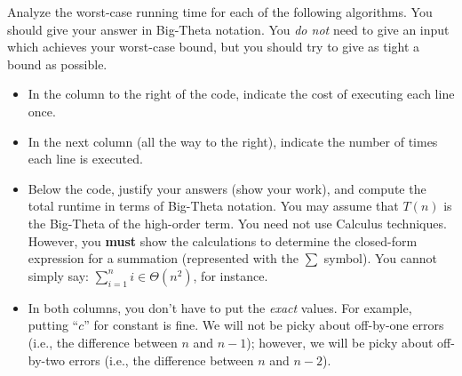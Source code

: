 \documentclass[9pt]{article}
\begin{document}
\item 
Analyze the worst-case running time for each of the following algorithms. You should give your answer in Big-Theta notation. You \emph{do not} need to give an input which achieves your worst-case bound, but you should try to give as tight a bound as possible. 
	\begin{itemize}
	\item In the column to the right of the code, indicate the cost of executing each line once.
	
	\item In the next column (all the way to the right), indicate the number of times each line is executed.
	
	\item Below the code, justify your answers (show your work), and compute the total runtime in terms of Big-Theta notation.  You may assume that $T(n)$ is the Big-Theta of the high-order term. You need not use Calculus techniques. However, you \textbf{must} show the calculations to determine the closed-form expression for a summation (represented with the $\displaystyle \sum$ symbol). You cannot simply say: $\displaystyle \sum_{i=1}^{n} i \in \Theta(n^{2})$, for instance.
	
	\item In both columns, you don't have to put the \emph{exact} values. For example, putting ``$c$'' for constant is fine. We will not be picky about off-by-one errors (i.e., the difference between $n$ and $n-1$); however, we will be picky about off-by-two errors (i.e., the difference between $n$ and $n-2$).
    \end{itemize}
\end{document}
